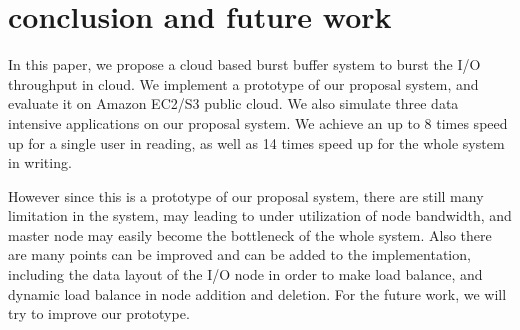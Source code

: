 \section{conclusion and future work}
\label{sec:conclusion}
In this paper, we propose a cloud based burst buffer system to burst the I/O throughput in cloud.
We implement a prototype of our proposal system, and evaluate it on Amazon EC2/S3 public cloud.
We also simulate three data intensive applications on our proposal system.
We achieve an up to 8 times speed up for a single user in reading, as well as 14 times speed
up for the whole system in writing.

However since this is a prototype of our proposal system, there are still many limitation in the
system, may leading to under utilization of node bandwidth, and master node may easily become the
bottleneck of the whole system.
Also there are many points can be improved and can be added to the implementation, including the
data layout of the I/O node in order to make load balance, and dynamic load balance in node addition
and deletion.
For the future work, we will try to improve our prototype.
